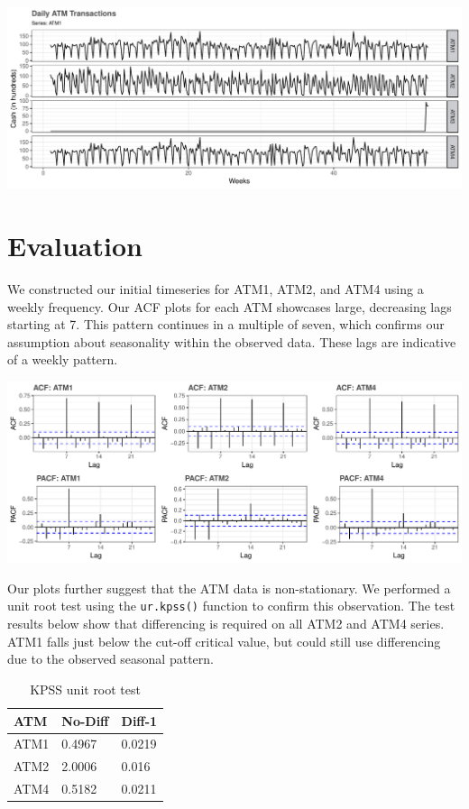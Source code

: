 \documentclass[openany]{book}
\begin{document}
\includegraphics{Part-A-JM_JO_files/figure-latex/unnamed-chunk-4-1.pdf}

\hypertarget{evaluation}{%
\section{Evaluation}\label{evaluation}}

We constructed our initial timeseries for ATM1, ATM2, and ATM4 using a
weekly frequency. Our ACF plots for each ATM showcases large, decreasing
lags starting at 7. This pattern continues in a multiple of seven, which
confirms our assumption about seasonality within the observed data.
These lags are indicative of a weekly pattern.

\includegraphics{Part-A-JM_JO_files/figure-latex/unnamed-chunk-5-1.pdf}

Our plots further suggest that the ATM data is non-stationary. We
performed a unit root test using the \texttt{ur.kpss()} function to
confirm this observation. The test results below show that differencing
is required on all ATM2 and ATM4 series. ATM1 falls just below the
cut-off critical value, but could still use differencing due to the
observed seasonal pattern.

\begin{table}[H]

\caption{\label{tab:unnamed-chunk-6}KPSS unit root test}
\centering
\begin{tabular}{l|l|l}
\hline
\textbf{ATM} & \textbf{No-Diff} & \textbf{Diff-1}\\
\hline
\rowcolor{gray!6}  ATM1 & 0.4967 & 0.0219\\
\hline
ATM2 & 2.0006 & 0.016\\
\hline
\rowcolor{gray!6}  ATM4 & 0.5182 & 0.0211\\
\hline
\end{tabular}
\end{table}
\end{document}
